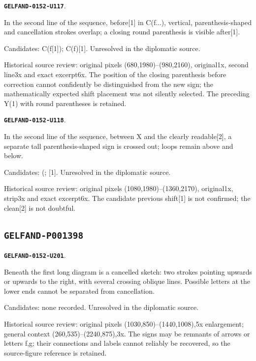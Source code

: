 \documentclass[11pt]{article}
\theoremstyle{definition}
\theoremstyle{remark}
\begin{document}
\par\noindent\leavevmode{}\label{GELFAND-0152-U117}\label{GELFAND-P001397:sequence-shifted-cone:note}\textbf{\texttt{GELFAND-0152-U117}}.\nopagebreak[4]\par
In the second line of the sequence, before[1] in C(f...), vertical, parenthesis-shaped and cancellation strokes overlap; a closing round parenthesis is visible after[1].\par
Candidates: C(f[1]); C(f)[1]. Unresolved in the diplomatic source.\par
Historical source review: original pixels (680,1980)–(980,2160), original1x, second line3x and exact excerpt6x. The position of the closing parenthesis before correction cannot confidently be distinguished from the new sign; the mathematically expected shift placement was not silently selected. The preceding Y(1) with round parentheses is retained.\par\medskip
\par\noindent\leavevmode{}\label{GELFAND-0152-U118}\label{GELFAND-P001397:sequence-shift-cancellation:note}\textbf{\texttt{GELFAND-0152-U118}}.\nopagebreak[4]\par
In the second line of the sequence, between X and the clearly readable[2], a separate tall parenthesis-shaped sign is crossed out; loops remain above and below.\par
Candidates: (; [1]. Unresolved in the diplomatic source.\par
Historical source review: original pixels (1080,1980)–(1360,2170), original1x, strip3x and exact excerpt6x. The candidate previous shift[1] is not confirmed; the clean[2] is not doubtful.\par\medskip
\subsection*{\texttt{GELFAND-P001398}}
\par\noindent\leavevmode{}\label{GELFAND-0152-U201}\label{GELFAND-P001398:cancelled-sketch:note}\textbf{\texttt{GELFAND-0152-U201}}.\nopagebreak[4]\par
Beneath the first long diagram is a cancelled sketch: two strokes pointing upwards or upwards to the right, with several crossing oblique lines. Possible letters at the lower ends cannot be separated from cancellation.\par
Candidates: none recorded. Unresolved in the diplomatic source.\par
Historical source review: original pixels (1030,850)–(1440,1008),5x enlargement; general context (260,535)–(2240,875),3x. The signs may be remnants of arrows or letters f,g; their connections and labels cannot reliably be recovered, so the source-figure reference is retained.\par\medskip
\end{document}
